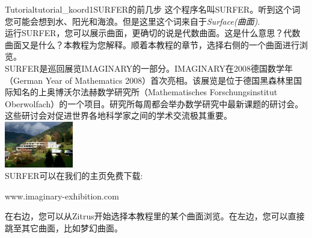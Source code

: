 ﻿\begin{surferIntroPage}{Tutorial}{tutorial_koord1}{SURFER的前几步}
这个程序名叫SURFER。听到这个词您可能会想到水、阳光和海浪。但是这里这个词来自于\textit{Surface(曲面)}.
\\

运行SURFER，您可以展示曲面，更确切的说是代数曲面。这是什么意思？代数曲面又是什么？本教程为您解释。顺着本教程的章节，选择右侧的一个曲面进行浏览。\\
SURFER是巡回展览IMAGINARY的一部分。IMAGINARY在2008德国数学年（German Year of Mathematics 2008）首次亮相。该展览是位于德国黑森林里国际知名的上奥博沃尔法赫数学研究所（Mathematisches Forschungsinstitut Oberwolfach）的一个项目。研究所每周都会举办数学研究中最新课题的研讨会。这些研讨会对促进世界各地科学家之间的学术交流极其重要。\\
\vspace{0.2cm} \hspace{3.5cm}\includegraphics[width=3cm]{./../../common/images/photo_mfo.jpg}\\
SURFER可以在我们的主页免费下载: \\
\begin{centering}
www.imaginary-exhibition.com\\
\end{centering}
 \vspace{0.2cm}
在右边，您可以从Zitrus开始选择本教程里的某个曲面浏览。在左边，您可以直接跳至其它曲面，比如梦幻曲面。
\end{surferIntroPage}

